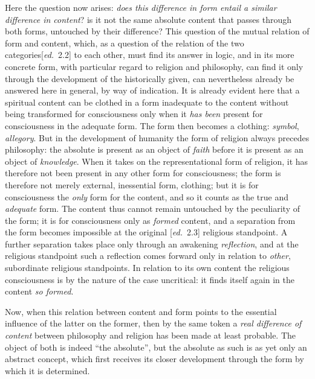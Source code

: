 \documentclass[12pt,a4paper,openany]{book}
\newcommand{\ed}[1]{{\small[\textit{ed.}\ #1]}}
\begin{document}
Here the question now arises: \emph{does this difference in form entail a similar
difference in content}? is it not the same absolute content
that passes through both forms, untouched by their difference?
This question of the mutual relation of form and content,
which, as a question of the relation of the two categories\ed{2.2} to each other,
must find its answer in logic, and in its more concrete form,
with particular regard to religion and philosophy, can find
it only through the development of the historically given, can nevertheless already
be answered here in general, by way of indication. It is already
evident here that a spiritual content can be clothed in a form
inadequate to the content without being transformed for consciousness only
when it \emph{has been} present for consciousness in the adequate form.
The form then becomes a clothing: \emph{symbol}, \emph{allegory}. But in the development
of humanity the form of religion always precedes
philosophy: the absolute is present as an object of \emph{faith} before it is
present as an object of \emph{knowledge}. When it takes on the representational form of religion,
it has therefore not been present in any other form
for consciousness; the form is therefore not merely external, inessential form,
clothing; but it is for consciousness the \emph{only} form for the content,
and so it counts as the true and \emph{adequate} form. The content
thus cannot remain untouched by the peculiarity of the form;
it is for consciousness only as \emph{formed} content, and a separation
from the form becomes impossible at the original \ed{2.3} religious standpoint.
A further separation takes place only through an awakening \emph{reflection},
and at the religious standpoint such a reflection comes forward only
in relation to \emph{other}, subordinate religious standpoints. In relation
to its own content the religious consciousness is by the nature of the case
uncritical: it finds itself again in the content \emph{so formed}.

Now, when this relation between content and form points to
the essential influence of the latter on the former, then by the same
token a \emph{real difference of content} between philosophy and religion
has been made at least probable. The object of both is indeed ``the absolute'',
but the absolute as such is as yet only an abstract
concept, which first receives its closer development through the form
by which it is determined.
\end{document}
